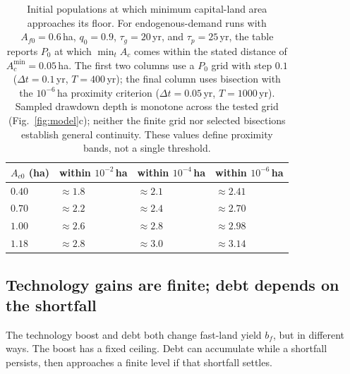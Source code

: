 \documentclass[preprint,12pt,authoryear]{elsarticle}
\newcommand{\Acmin}{A_c^{\min}}
\begin{document}
\begin{table}[!htbp]
\centering\small
\caption{Initial populations at which minimum capital-land area approaches its floor. For endogenous-demand runs with $A_{f0}=0.6$\,ha, $q_0=0.9$, $\tau_g=20$\,yr, and $\tau_p=25$\,yr, the table reports $P_0$ at which $\min_tA_c$ comes within the stated distance of $\Acmin=0.05$\,ha. The first two columns use a $P_0$ grid with step $0.1$ ($\Delta t=0.1$\,yr, $T=400$\,yr); the final column uses bisection with the $10^{-6}$\,ha proximity criterion ($\Delta t=0.05$\,yr, $T=1000$\,yr). Sampled drawdown depth is monotone across the tested grid (Fig.~\ref{fig:model}c); neither the finite grid nor selected bisections establish general continuity. These values define proximity bands, not a single threshold.}
\label{tab:model}
\begin{tabular}{l l l l}
\toprule
$A_{c0}$ (ha) & within $10^{-2}$\,ha & within $10^{-4}$\,ha & within $10^{-6}$\,ha \\
\midrule
$0.40$ & $\approx1.8$ & $\approx2.1$ & $\approx2.41$ \\
$0.70$ & $\approx2.2$ & $\approx2.4$ & $\approx2.70$ \\
$1.00$ & $\approx2.6$ & $\approx2.8$ & $\approx2.98$ \\
$1.18$ & $\approx2.8$ & $\approx3.0$ & $\approx3.14$ \\
\bottomrule
\end{tabular}
\end{table}


\subsection{Technology gains are finite; debt depends on the shortfall}\label{sec:bounded}

The technology boost and debt both change fast-land yield $b_f$, but in different ways. The boost has a fixed ceiling. Debt can accumulate while a shortfall persists, then approaches a finite level if that shortfall settles.
\end{document}
